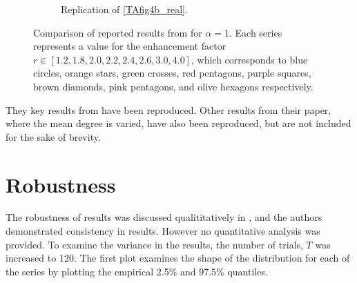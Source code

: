 \begin{figure}[!h]
\begin{subfigure}[b]{0.45\textwidth}
    \caption{Replication of \ref{TAfig4b_real}. }
    \label{TAfig4b}
  \end{subfigure}
  \caption{Comparison of reported results from \cite{RN49} for $\alpha = 1$. Each series represents a value for the enhancement factor $r \in [1.2, 1.8, 2.0, 2.2, 2.4, 2.6, 3.0, 4.0]$, which corresponds to blue circles, orange stars, green crosses, red pentagons, purple squares, brown diamonds, pink pentagons, and olive hexagons respectively. } \label{comp2}
\end{figure} 
\FloatBarrier

They key results from \cite{RN49} have been reproduced. Other results from their paper, where the mean degree is varied, have also been reproduced, but are not included for the sake of brevity.\\


\section{Robustness}
The robustness of results was discussed qualititatively in \cite{RN49}, and the authors demonstrated consistency in results. However no quantitative analysis was provided. To examine the variance in the results, the number of trials, $T$ was increased to 120. The first plot examines the shape of the distribution for each of the series by plotting the empirical 2.5\% and 97.5\% quantiles. \\

